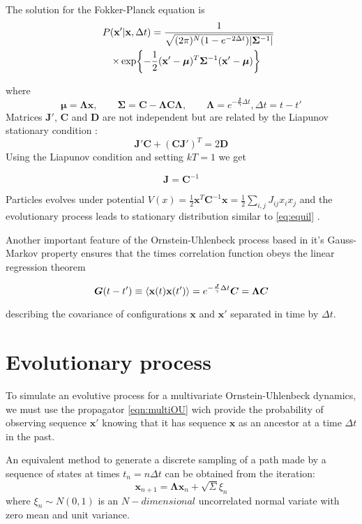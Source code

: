 \documentclass[reprint,amsmath,amssymb,superscriptaddress,showpacs,pre]{revtex4-1}
\let\originalleft\left
\let\originalright\right
\renewcommand{\left}{\mathopen{}\mathclose\bgroup\originalleft}
\renewcommand{\right}{\aftergroup\egroup\originalright}
\newcommand{\Lam}{\bm{\Lambda}}
\begin{document}
The solution for the  Fokker-Planck equation is 
\begin{eqnarray}
\nonumber
\lefteqn{P(\mathbf{x} ' | \mathbf{x} , \Delta t) =\frac{1}{\sqrt{(2\pi)^N(1-e^{-2\Delta t})\vert\bm{\Sigma}^{-1}\vert}}}\\%
&&\times \exp\left\{ -\frac{1}{2}(\mathbf{x} '-\bm{\mu})^T\bm{\Sigma}^{-1}(\mathbf{x} '- \bm{\mu}) \right\}
\label{eqn:multiOU}
\end{eqnarray}

where 
$$ \bm{\mu} = \Lam \mathbf{x}, \qquad \bm{\Sigma} = \bm{C} - \Lam\bm{C}\Lam, \qquad \Lam = e^{-\bm{\frac{J}{\gamma}}\Delta t}, \Delta t=t-t'$$ 
Matrices $\bm J'$, $\bm C$ and $\bm D$ are not independent but are related by the Liapunov stationary condition :
$$\bm J' \bm C+(\bm C \bm J')^T=2 \bm D$$
Using the Liapunov condition and setting $kT=1$ we get 

\begin{equation}
\bm J=\bm C^{-1}
\end{equation}

Particles evolves under potential  $V(x)=\frac{1}{2}\mathbf{x}^T\bm{C}^{-1}\mathbf{x} = \frac{1}{2}\sum_{i,j} J_{ij}x_i x_j$ and the evolutionary process leads to stationary distribution similar to \ref{eq:equil} .

Another important feature  of the Ornstein-Uhlenbeck process based in it's Gauss-Markov property ensures that the times correlation function obeys the linear regression theorem

\begin{equation}
\bm G(t-t')\equiv \left\langle \mathbf{x}(t)\mathbf{x}(t')\right\rangle= e^{-\frac{\bm{ J}}{\gamma}\Delta t} \bm C=\Lam \bm{C}
\end{equation}

describing the covariance of configurations $\mathbf{x}$ and $\mathbf{x}'$ separated in time by $\Delta t$.



\section{Evolutionary process}
\label{evolutionary process}
To simulate an evolutive process for a  multivariate Ornstein-Uhlenbeck dynamics, we must use the propagator \ref{eqn:multiOU} wich provide the probability of observing sequence $\mathbf{x}'$ knowing that it has sequence $\mathbf{x}$ as an ancestor at a time $\Delta t$ in the past. 

An equivalent  method   to generate  a discrete sampling of a path made by  a sequence of states at times $t_n= n \Delta t$ can be obtained from the iteration:
\begin{equation}
\mathbf{x}_{n+1}=\Lam \mathbf{x}_n+\sqrt{\Sigma}\xi_n
\label{eq:evol}
\end{equation}
where $\xi_n\sim N(0,1)$ is an $N-dimensional$ uncorrelated normal variate with zero mean and unit variance.
\end{document}
